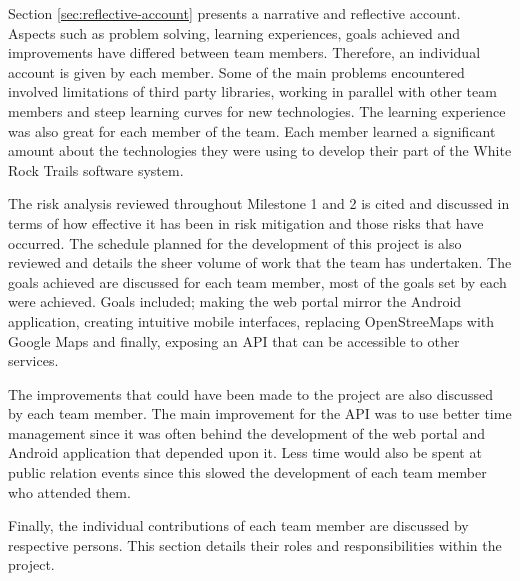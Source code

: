 \documentclass[11pt,a4paper]{report}
\begin{document}
Section \ref{sec:reflective-account} presents a narrative and reflective account. Aspects such as problem solving, learning experiences, goals achieved and improvements have differed between team members. Therefore, an individual account is given by each member. Some of the main problems encountered involved limitations of third party libraries, working in parallel with other team members and steep learning curves for new technologies. The learning experience was also great for each member of the team. Each member learned a significant amount about the technologies they were using to develop their part of the White Rock Trails software system.

The risk analysis reviewed throughout Milestone 1 and 2 is cited and discussed in terms of how effective it has been in risk mitigation and those risks that have occurred. The schedule planned for the development of this project is also reviewed and details the sheer volume of work that the team has undertaken. The goals achieved are discussed for each team member, most of the goals set by each were achieved. Goals included; making the web portal mirror the Android application, creating intuitive mobile interfaces, replacing OpenStreeMaps with Google Maps and finally, exposing an API that can be accessible to other services.

The improvements that could have been made to the project are also discussed by each team member. The main improvement for the API was to use better time management since it was often behind the development of the web portal and Android application that depended upon it. Less time would also be spent at public relation events since this slowed the development of each team member who attended them.

Finally, the individual contributions of each team member are discussed by respective persons. This section details their roles and responsibilities within the project.

\newpage

\newpage



\appendix
\end{document}
